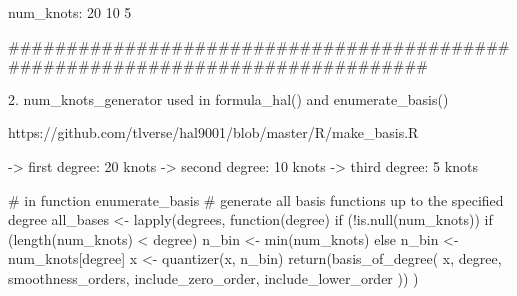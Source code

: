 num_knots: 
	20 10  5
	
	

###############################################################################

2. num_knots_generator used in formula_hal() and enumerate_basis()

https://github.com/tlverse/hal9001/blob/master/R/make_basis.R

-> first degree: 20 knots
-> second degree: 10 knots
-> third degree: 5 knots

# in function enumerate_basis
# generate all basis functions up to the specified degree
  all_bases <- lapply(degrees, function(degree) {
    if (!is.null(num_knots)) {
      if (length(num_knots) < degree) {
        n_bin <- min(num_knots)
      } else {
        n_bin <- num_knots[degree]
      }
      x <- quantizer(x, n_bin)
    }
    return(basis_of_degree(
      x, degree, smoothness_orders, include_zero_order,
      include_lower_order
    ))
  })
  
  
  
 
  
	
